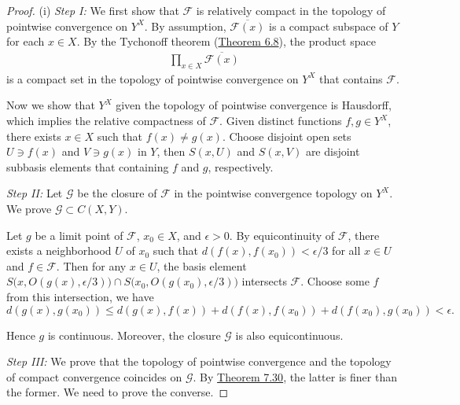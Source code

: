 \documentclass{article}
\numberwithin{equation}{section}
\theoremstyle{plain}
\theoremstyle{definition}
\begin{document}
\begin{proof}
(i) \textit{Step I:} We first show that $\mathcal{F}$ is relatively compact in the topology of pointwise convergence on $Y^X$. By assumption, $\overline{\mathcal{F}(x)}$ is a compact subspace of $Y$ for each $x\in X$. By the Tychonoff theorem (\hyperref[thm:6.8]{Theorem 6.8}), the product space
\begin{align*}
	\prod_{x\in X}\overline{\mathcal{F}(x)}
\end{align*}
is a compact set in the topology of pointwise convergence on $Y^X$ that contains $\mathcal{F}$.

Now we show that $Y^X$ given the topology of pointwise convergence is Hausdorff, which implies the relative compactness of $\mathcal{F}$. Given distinct functions $f,g\in Y^X$, there exists $x\in X$ such that $f(x)\neq g(x)$. Choose disjoint open sets $U\ni f(x)$ and $V\ni g(x)$ in $Y$, then $S(x,U)$ and $S(x,V)$ are disjoint subbasis elements that containing $f$ and $g$, respectively.

\vspace{0.12cm}
\textit{Step II:} Let $\mathcal{G}$ be the closure of $\mathcal{F}$ in the pointwise convergence topology on $Y^X$. We prove $\mathcal{G}\subset C(X,Y)$.

Let $g$ be a limit point of $\mathcal{F}$, $x_0\in X$, and $\epsilon > 0$. By equicontinuity of $\mathcal{F}$, there exists a neighborhood $U$ of $x_0$ such that $d(f(x),f(x_0))<\epsilon/3$ for all $x\in U$ and $f\in\mathcal{F}$. Then for any $x\in U$, the basis element $S\bigl(x,O(g(x),\epsilon/3)\bigr)\cap S\bigl(x_0,O(g(x_0),\epsilon/3)\bigr)$ intersects $\mathcal{F}$. Choose some $f$ from this intersection, we have 
$$d(g(x),g(x_0))\leq d(g(x),f(x))+d(f(x),f(x_0))+d(f(x_0),g(x_0))<\epsilon.$$

Hence $g$ is continuous. Moreover, the closure $\mathcal{G}$ is also equicontinuous.

\vspace{0.12cm}
\textit{Step III:} We prove that the topology of pointwise convergence and the topology of compact convergence coincides on $\mathcal{G}$. By \hyperref[thm:7.30]{Theorem 7.30}, the latter is finer than the former. We need to prove the converse.


\end{proof}
\end{document}
